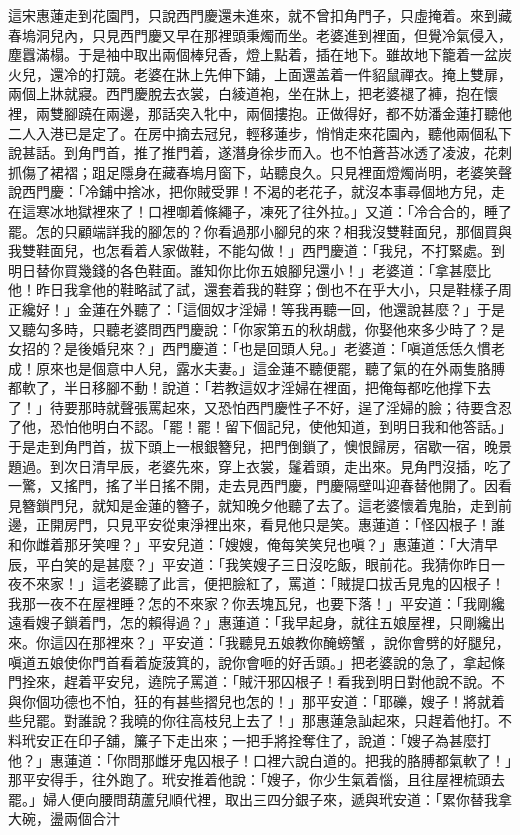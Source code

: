 \begin{showcontents}{}
這宋惠蓮走到花園門，只說西門慶還未進來，就不曾扣角門子，只虛掩着。來到藏春塢洞兒內，只見西門慶又早在那裡頭秉燭而坐。老婆進到裡面，但覺冷氣侵入，塵囂滿榻。于是袖中取出兩個棒兒香，燈上點着，插在地下。雖故地下籠着一盆炭火兒，還冷的打競。老婆在牀上先伸下鋪，上面還盖着一件貂鼠禪衣。掩上雙扉，兩個上牀就寢。西門慶脫去衣裳，白綾道袍，坐在牀上，把老婆褪了褲，抱在懷裡，兩雙腳蹺在兩邊，那話突入牝中，兩個摟抱。正做得好，都不妨潘金蓮打聽他二人入港已是定了。在房中摘去冠兒，輕移蓮步，悄悄走來花園內，聽他兩個私下說甚話。到角門首，推了推門着，遂潛身徐步而入。也不怕蒼苔冰透了凌波，花刺抓傷了裙褶；跙足隱身在藏春塢月窗下，站聽良久。只見裡面燈燭尚明，老婆笑聲說西門慶：「冷鋪中捨冰，把你賊受罪！不渴的老花子，就沒本事尋個地方兒，走在這寒冰地獄裡來了！口裡啣着條繩子，凍死了往外拉。」又道：「冷合合的，睡了罷。怎的只顧端詳我的腳怎的？你看過那小腳兒的來？相我沒雙鞋面兒，那個買與我雙鞋面兒，也怎看着人家做鞋，不能勾做！」西門慶道：「我兒，不打緊處。到明日替你買幾錢的各色鞋面。誰知你比你五娘腳兒還小！」老婆道：「拿甚麼比他！昨日我拿他的鞋略試了試，還套着我的鞋穿；倒也不在乎大小，只是鞋樣子周正纔好！」金蓮在外聽了：「這個奴才淫婦！等我再聽一回，他還說甚麼？」于是又聽勾多時，只聽老婆問西門慶說：「你家第五的秋胡戲，你娶他來多少時了？是女招的？是後婚兒來？」西門慶道：「也是回頭人兒。」老婆道：「嗔道恁恁久慣老成！原來也是個意中人兒，露水夫妻。」這金蓮不聽便罷，聽了氣的在外兩隻胳膊都軟了，半日移腳不動！說道：「若教這奴才淫婦在裡面，把俺每都吃他撑下去了！」待要那時就聲張罵起來，又恐怕西門慶性子不好，逞了淫婦的臉；待要含忍了他，恐怕他明白不認。「罷！罷！留下個記兒，使他知道，到明日我和他答話。」于是走到角門首，拔下頭上一根銀簪兒，把門倒鎖了，懊恨歸房，宿歇一宿，晚景題過。到次日清早辰，老婆先來，穿上衣裳，鬔着頭，走出來。見角門沒插，吃了一驚，又搖門，搖了半日搖不開，走去見西門慶，門慶隔壁叫迎春替他開了。因看見簪鎖門兒，就知是金蓮的簪子，就知晚夕他聽了去了。這老婆懷着鬼胎，走到前邊，正開房門，只見平安從東淨裡出來，看見他只是笑。惠蓮道：「怪囚根子！誰和你雌着那牙笑哩？」平安兒道：「嫂嫂，俺每笑笑兒也嗔？」惠蓮道：「大清早辰，平白笑的是甚麼？」平安道：「我笑嫂子三日沒吃飯，眼前花。我猜你昨日一夜不來家！」這老婆聽了此言，便把臉紅了，罵道：「賊提口拔舌見鬼的囚根子！我那一夜不在屋裡睡？怎的不來家？你丟塊瓦兒，也要下落！」平安道：「我剛纔遠看嫂子鎖着門，怎的賴得過？」惠蓮道：「我早起身，就往五娘屋裡，只剛纔出來。你這囚在那裡來？」平安道：「我聽見五娘教你醃螃蟹 ，說你會劈的好腿兒，嗔道五娘使你門首看着旋菠箕的，說你會咂的好舌頭。」把老婆說的急了，拿起條門拴來，趕着平安兒，遶院子罵道：「賊汗邪囚根子！看我到明日對他說不說。不與你個功德也不怕，狂的有甚些摺兒也怎的！」那平安道：「耶礫，嫂子！將就着些兒罷。對誰說？我曉的你往高枝兒上去了！」那惠蓮急訕起來，只趕着他打。不料玳安正在印子舖，簾子下走出來；一把手將拴奪住了，說道：「嫂子為甚麼打他？」惠蓮道：「你問那雌牙鬼囚根子！口裡六說白道的。把我的胳膊都氣軟了！」那平安得手，往外跑了。玳安推着他說：「嫂子，你少生氣着惱，且往屋裡梳頭去罷。」婦人便向腰問葫蘆兒順代裡，取出三四分銀子來，遞與玳安道：「累你替我拿大碗，盪兩個合汁 
\end{showcontents}
